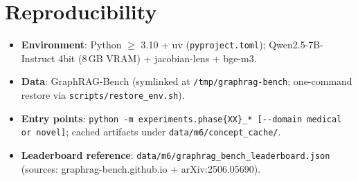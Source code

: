 \section{Reproducibility}
\label{app:repro}

\begin{itemize}
\item \textbf{Environment}: Python $\geq$ 3.10 + uv (\texttt{pyproject.toml});
Qwen2.5-7B-Instruct 4bit (8\,GB VRAM) + jacobian-lens + bge-m3.
\item \textbf{Data}: GraphRAG-Bench (symlinked at \texttt{/tmp/graphrag-bench};
one-command restore via \texttt{scripts/restore\_env.sh}).
\item \textbf{Entry points}: \texttt{python -m experiments.phase\{XX\}\_*
[{-}{-}domain medical or novel]}; cached artifacts under
\texttt{data/m6/concept\_cache/}.
\item \textbf{Leaderboard reference}:
\texttt{data/m6/graphrag\_bench\_leaderboard.json} (sources:
graphrag-bench.github.io + arXiv:2506.05690).
\end{itemize}

